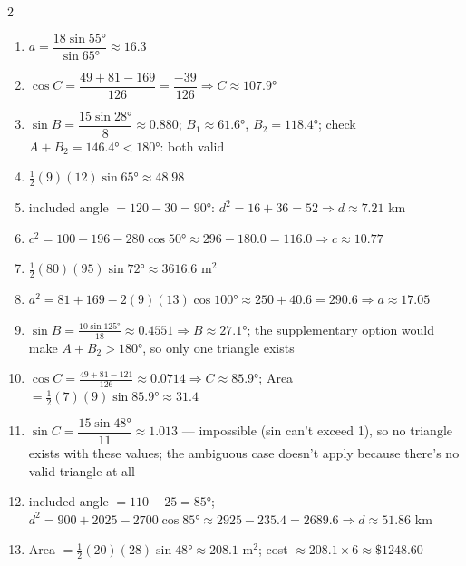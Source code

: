 \documentclass[11pt]{article}
\begin{document}
\begin{keybox}
\begin{multicols}{2}
\small
\begin{enumerate}[leftmargin=*,itemsep=3pt]
  \item $a=\dfrac{18\sin55°}{\sin65°}\approx16.3$
  \item $\cos C=\dfrac{49+81-169}{126}=\dfrac{-39}{126}\Rightarrow C\approx107.9°$
  \item $\sin B=\dfrac{15\sin28°}{8}\approx0.880$; $B_1\approx61.6°$, $B_2=118.4°$; check $A+B_2=146.4°<180°$: both valid
  \item $\tfrac12(9)(12)\sin65°\approx48.98$
  \item included angle $=120-30=90°$: $d^2=16+36=52\Rightarrow d\approx7.21$ km
  \item $c^2=100+196-280\cos50°\approx296-180.0=116.0\Rightarrow c\approx10.77$
  \item $\tfrac12(80)(95)\sin72°\approx3616.6\text{ m}^2$
  \item $a^2=81+169-2(9)(13)\cos100°\approx250+40.6=290.6\Rightarrow a\approx17.05$
  \item $\sin B=\tfrac{10\sin125°}{18}\approx0.4551\Rightarrow B\approx27.1°$; the supplementary option would make $A+B_2>180°$, so only one triangle exists
  \item $\cos C=\tfrac{49+81-121}{126}\approx0.0714\Rightarrow C\approx85.9°$; Area $=\tfrac12(7)(9)\sin85.9°\approx31.4$
  \item $\sin C=\dfrac{15\sin48°}{11}\approx1.013$ --- impossible (sin can't exceed 1), so no triangle exists with these values; the ambiguous case doesn't apply because there's no valid triangle at all
  \item included angle $=110-25=85°$; $d^2=900+2025-2700\cos85°\approx2925-235.4=2689.6\Rightarrow d\approx51.86$ km
  \item Area $=\tfrac12(20)(28)\sin48°\approx208.1\text{ m}^2$; cost $\approx208.1\times6\approx\$1248.60$
\end{enumerate}
\end{multicols}
\end{keybox}
\end{document}
